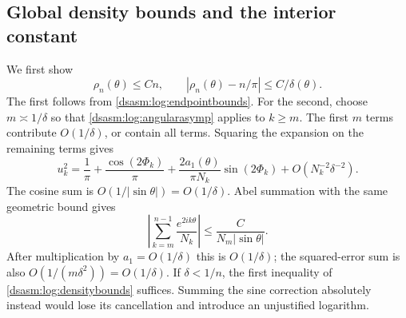 \documentclass[11pt,letterpaper]{article}
\theoremstyle{remark}\newtheorem{remark}[theorem]{Remark}
\begin{document}
\subsection{Global density bounds and the interior constant}
We first show
\begin{equation}\label{dsasm:log:densitybounds}
 \rho_n(\theta)\le Cn,\qquad
 |\rho_n(\theta)-n/\pi|\le C/\delta(\theta).
\end{equation}
The first follows from \eqref{dsasm:log:endpointbounds}. For the second,
choose $m\asymp1/\delta$ so that \eqref{dsasm:log:angularasymp} applies to
$k\ge m$. The first $m$ terms contribute $O(1/\delta)$, or contain
all terms. Squaring the expansion on the remaining terms gives
\[
 u_k^2=\frac1\pi+\frac{\cos(2\Phi_k)}\pi
       +\frac{2a_1(\theta)}{\pi N_k}\sin(2\Phi_k)
       +O(N_k^{-2}\delta^{-2}).
\]
The cosine sum is $O(1/|\sin\theta|)=O(1/\delta)$.
Abel summation with the same geometric bound gives
\[
 \left|\sum_{k=m}^{n-1}\frac{e^{2ik\theta}}{N_k}\right|
 \le\frac{C}{N_m|\sin\theta|}.
\]
After multiplication by $a_1=O(1/\delta)$ this is $O(1/\delta)$;
the squared-error sum is also $O(1/(m\delta^2))=O(1/\delta)$.
If $\delta<1/n$, the first inequality of \eqref{dsasm:log:densitybounds}
suffices. Summing the sine correction absolutely instead would
lose its cancellation and introduce an unjustified logarithm.
\end{document}
